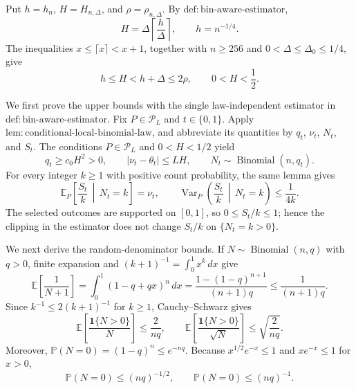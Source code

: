 Put \(h=h_n\), \(H=H_{n,\Delta}\), and \(\rho=\rho_{n,\Delta}\).  By \(\mathrm{def:bin\text{-}aware\text{-}estimator}\),
\[
 H=\Delta\left\lceil\frac{h}{\Delta}\right\rceil,
 \qquad h=n^{-1/4}.
\]
The inequalities \(x\leq\lceil x\rceil<x+1\), together with \(n\geq256\) and \(0<\Delta\leq\Delta_0\leq1/4\), give
\[
 h\leq H<h+\Delta\leq2\rho,
 \qquad 0<H<\frac12.
\]

We first prove the upper bounds with the single law-independent estimator in \(\mathrm{def:bin\text{-}aware\text{-}estimator}\).  Fix \(P\in\mathcal P_L\) and \(t\in\{0,1\}\).  Apply \(\mathrm{lem:conditional\text{-}local\text{-}binomial\text{-}law}\), and abbreviate its quantities by \(q_t\), \(\nu_t\), \(N_t\), and \(S_t\).  The conditions \(P\in\mathcal P_L\) and \(0<H<1/2\) yield
\[
 q_t\geq c_0H^2>0,
 \qquad |\nu_t-\theta_t|\leq LH,
 \qquad N_t\sim\operatorname{Binomial}(n,q_t).
\]
For every integer \(k\geq1\) with positive count probability, the same lemma gives
\[
 \mathbb E_P\!\left[\frac{S_t}{k}\,\middle|\,N_t=k\right]=\nu_t,
 \qquad
 \operatorname{Var}_P\!\left(\frac{S_t}{k}\,\middle|\,N_t=k\right)\leq\frac1{4k}.
\]
The selected outcomes are supported on \([0,1]\), so \(0\leq S_t/k\leq1\); hence the clipping in the estimator does not change \(S_t/k\) on \(\{N_t=k>0\}\).

We next derive the random-denominator bounds.  If \(N\sim\operatorname{Binomial}(n,q)\) with \(q>0\), finite expansion and \((k+1)^{-1}=\int_0^1x^k\,dx\) give
\[
 \mathbb E\!\left[\frac1{N+1}\right]
 =\int_0^1(1-q+qx)^n\,dx
 =\frac{1-(1-q)^{n+1}}{(n+1)q}
 \leq\frac1{(n+1)q}.
\]
Since \(k^{-1}\leq2(k+1)^{-1}\) for \(k\geq1\), Cauchy--Schwarz gives
\[
 \mathbb E\!\left[\frac{\mathbf1\{N>0\}}N\right]
 \leq\frac2{nq},
 \qquad
 \mathbb E\!\left[\frac{\mathbf1\{N>0\}}{\sqrt N}\right]
 \leq\sqrt{\frac2{nq}}.
\]
Moreover, \(\mathbb P(N=0)=(1-q)^n\leq e^{-nq}\).  Because \(x^{1/2}e^{-x}\leq1\) and \(xe^{-x}\leq1\) for \(x>0\),
\[
 \mathbb P(N=0)\leq(nq)^{-1/2},
 \qquad
 \mathbb P(N=0)\leq(nq)^{-1}.
\]

